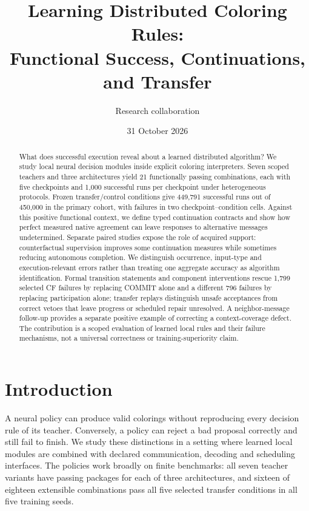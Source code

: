 \documentclass[10pt]{article}
\title{Learning Distributed Coloring Rules:\\Functional Success, Continuations, and Transfer}
\author{Research collaboration}
\date{31 October 2026}
\begin{document}
\maketitle
\begin{abstract}
What does successful execution reveal about a learned distributed algorithm?
We study local neural decision modules inside explicit coloring interpreters.
Seven scoped teachers and three architectures yield 21 functionally passing
combinations, each with five checkpoints and 1,000 successful runs per
checkpoint under heterogeneous protocols. Frozen transfer/control conditions give
449,791 successful runs out of 450,000 in the primary cohort, with failures
in two checkpoint--condition cells. Against this positive functional context,
we define typed continuation contracts and show how perfect measured native
agreement can leave responses to alternative messages undetermined.
Separate paired studies expose the role of acquired support: counterfactual
supervision improves some continuation measures while sometimes reducing
autonomous completion. We distinguish occurrence, input-type and
execution-relevant errors rather than treating one aggregate accuracy as
algorithm identification. Formal transition statements and component
interventions rescue 1,799 selected CF failures by replacing COMMIT alone
and a different 796 failures by replacing participation alone;
transfer replays distinguish unsafe acceptances from correct vetoes that
leave progress or scheduled repair unresolved. A neighbor-message follow-up
provides a separate positive example of correcting a context-coverage defect.
The contribution is a scoped evaluation of learned local rules and their
failure mechanisms, not a universal correctness or training-superiority claim.
\end{abstract}

\section{Introduction}
A neural policy can produce valid colorings without reproducing every
decision rule of its teacher. Conversely, a policy can reject a bad proposal
correctly and still fail to finish. We study these distinctions in a setting
where learned local modules are combined with declared communication,
decoding and scheduling interfaces. The policies work broadly on finite
benchmarks: all seven teacher variants have passing packages for each of
three architectures, and sixteen of eighteen extensible combinations pass
all five selected transfer conditions in all five training seeds.
\end{document}
